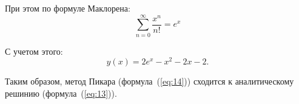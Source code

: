 \begin{enumerate}[label=\textbf{\arabic*})]
        При этом по формуле Маклорена:
        \begin{equation*}
            \sum\limits_{n=0}^{\infty} \frac{x^n}{n!} = e^x
        \end{equation*}

        С учетом этого:
        \begin{equation}\label{eq:14}
            y(x) = 2e^x - x^2 - 2x - 2.
        \end{equation}

        Таким образом, метод Пикара (формула~(\ref{eq:14})) сходится к
        аналитическому решинию (формула~(\ref{eq:13})).
\end{enumerate}
